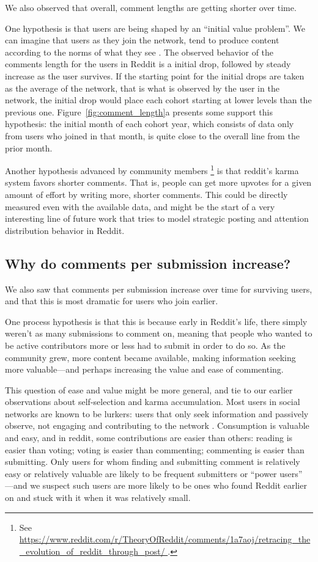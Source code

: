 We also observed that overall, comment lengths are getting shorter over time.  

One hypothesis is that users are being shaped by an ``initial value problem''. We can imagine that users as they join the network, tend to produce content according to the norms of what they see \cite{Kooti2010, Danescu-niculescu-mizil2013}.  The observed behavior of the comments length for the users in Reddit is a initial drop, followed by steady increase as the user survives. If the starting point for the initial drops are taken as the average of the network, that is what is observed by the user in the network, the initial drop would place each cohort starting at lower levels than the previous one.  Figure~\ref{fig:comment_length}a presents some support this hypothesis: the initial month of each cohort year, which consists of data only from users who joined in that month, is quite close to the overall line from the prior month.  

Another hypothesis advanced by community members \footnote{See \url{https://www.reddit.com/r/TheoryOfReddit/comments/1a7aoj/retracing_the_evolution_of_reddit_through_post/  }.} is that reddit's karma system favors shorter comments.  That is, people can get more upvotes for a given amount of effort by writing more, shorter comments.  This could be directly measured even with the available data, and might be the start of a very interesting line of future work that tries to model strategic posting and attention distribution behavior in Reddit. 

\subsection{Why do comments per submission increase?}

We also saw that comments per submission increase over time for surviving users, and that this is most dramatic for users who join earlier.

One process hypothesis is that this is because early in Reddit's life, there simply weren't as many submissions to comment on, meaning that people who wanted to be active contributors more or less had to submit in order to do so.  
As the community grew, more content became available, making information seeking more valuable---and perhaps increasing the value and ease of commenting. 

This question of ease and value might be more general, and tie to our earlier observations about self-selection and karma accumulation.  Most users in social networks are known to be lurkers: users that only seek information and passively observe, not engaging and contributing to the network \cite{Rafaeli2004, Nonnecke2000}.  Consumption is valuable and easy, and in reddit, some contributions are easier than others: reading is easier than voting; voting is easier than commenting; commenting is easier than submitting.  Only users for whom finding and submitting comment is relatively easy or relatively valuable are likely to be frequent submitters or ``power users'' \cite{Panciera2009, Kittur2007}---and we suspect such users are more likely to be ones who found Reddit earlier on and stuck with it when it was relatively small.

